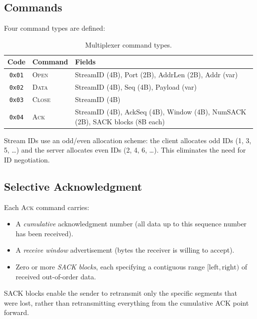 \documentclass[11pt,a4paper]{article}
\begin{document}
\subsection{Commands}\label{sec:commands}

Four command types are defined:

\begin{table}[htbp]
\centering
\caption{Multiplexer command types.}
\label{tab:commands}
\begin{tabular}{@{}clp{7cm}@{}}
\toprule
\textbf{Code} & \textbf{Command} & \textbf{Fields} \\
\midrule
\texttt{0x01} & \textsc{Open} & StreamID (4B), Port (2B), AddrLen (2B), Addr (var) \\
\texttt{0x02} & \textsc{Data} & StreamID (4B), Seq (4B), Payload (var) \\
\texttt{0x03} & \textsc{Close} & StreamID (4B) \\
\texttt{0x04} & \textsc{Ack} & StreamID (4B), AckSeq (4B), Window (4B), NumSACK (2B), SACK blocks (8B each) \\
\bottomrule
\end{tabular}
\end{table}

Stream IDs use an odd/even allocation scheme: the client allocates odd IDs (1, 3, 5, \ldots) and the server allocates even IDs (2, 4, 6, \ldots). This eliminates the need for ID negotiation.

\subsection{Selective Acknowledgment}\label{sec:sack}

Each \textsc{Ack} command carries:
\begin{itemize}[nosep]
  \item A \emph{cumulative} acknowledgment number (all data up to this sequence number has been received).
  \item A \emph{receive window} advertisement (bytes the receiver is willing to accept).
  \item Zero or more \emph{SACK blocks}, each specifying a contiguous range $[\text{left}, \text{right})$ of received out-of-order data.
\end{itemize}

SACK blocks enable the sender to retransmit only the specific segments that were lost, rather than retransmitting everything from the cumulative ACK point forward.
\end{document}
